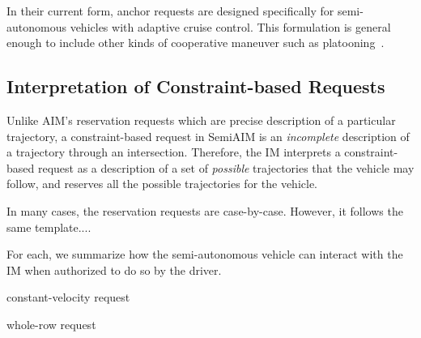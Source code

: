 In their current form, anchor requests are designed specifically for
semi-autonomous vehicles with adaptive cruise control.  This
formulation is general enough to include other kinds of cooperative
maneuver such as platooning~\cite{bib:Sheikholeslam90Longitudinal}.


\subsection{Interpretation of Constraint-based Requests}

Unlike AIM's reservation requests which are precise description of a
particular trajectory, a constraint-based request in SemiAIM is an
\emph{incomplete} description of a trajectory through an intersection.
Therefore, the IM interprets a constraint-based request as a
description of a set of \emph{possible} trajectories that the vehicle
may follow, and reserves all the possible trajectories for the
vehicle.

In many cases, the reservation requests are case-by-case.
However, it follows the same template....


For each, we summarize how the
semi-autonomous vehicle can interact with the IM when authorized to do
so by the driver.  

constant-velocity request

whole-row request






